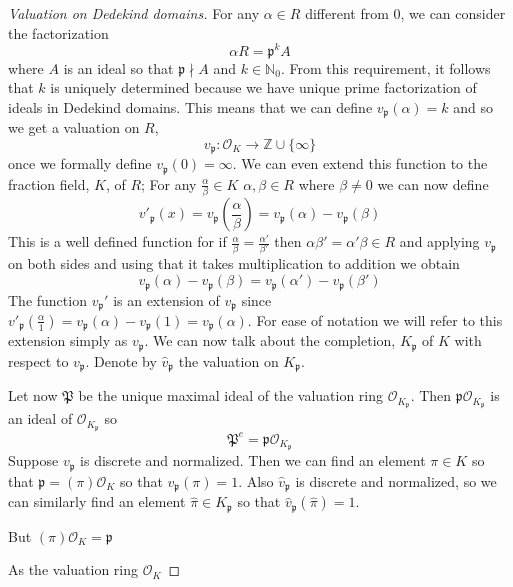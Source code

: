 \documentclass{article}
\newcommand{\mfrak}[1]{\mathfrak{#1}}
\newcommand{\mcal}[1]{\mathcal{#1}}
\newcommand{\mbb}[1]{\mathbb{#1}}
\begin{document}
\begin{proof}[Valuation on Dedekind domains]
    For any $\alpha \in R$ different from 0, we can consider the factorization
    $$\alpha R = \mfrak p^k A$$
    where $A$ is an ideal so that $\mfrak{p} \nmid A$ and $k \in \mbb N_0$. From this requirement, it follows that $k$ is uniquely determined because we have unique prime factorization of ideals in Dedekind domains. This means that we can define $v_\mfrak p(\alpha) = k$ and so we get a valuation on $R$,
    $$v_\mfrak p : \mathcal O_K \to \mbb{Z} \cup \{\infty\}$$
    once we formally define $v_\mfrak p(0) = \infty$. We can even extend this function to the fraction field, $K$, of $R$; For any $\frac{\alpha}{\beta} \in K$ $\alpha, \beta \in R$ where $\beta \neq 0$ we can now define
    $$v'_\mfrak p(x) = v_\mfrak p \left(\frac{\alpha}{\beta}\right) = v_\mfrak p(\alpha) - v_\mfrak p(\beta)$$
    This is a well defined function for if $\frac{\alpha}{\beta} = \frac{\alpha'}{\beta'}$ then $\alpha\beta' = \alpha'\beta \in R$ and applying $v_\mfrak{p}$ on both sides and using that it takes multiplication to addition we obtain
    $$v_\mfrak{p}(\alpha) - v_\mfrak{p}(\beta) = v_\mfrak{p}(\alpha') - v_\mfrak{p}(\beta')$$
    The function $v_\mfrak p'$ is an extension of $v_\mfrak p$ since $v'_\mfrak p(\frac{\alpha}{1}) = v_\mfrak p(\alpha) - v_\mfrak p (1) = v_\mfrak p(\alpha)$. For ease of notation we will refer to this extension simply as $v_\mfrak p$. We can now talk about the completion, $K_\mfrak p$ of $K$ with respect to $v_\mfrak p$. Denote by $\hat v_\mfrak p$ the valuation on $K_\mfrak p$. 
    
    
    
    Let now $\mfrak P$ be the unique maximal ideal of the valuation ring $\mcal O_{K_\mfrak p}$. Then $\mfrak p \mcal O_{K_\mfrak p}$ is an ideal of $\mcal O_{K_\mfrak p}$ so 
    $$\mfrak P^e = \mfrak p \mcal O_{K_\mfrak p}$$
    Suppose $v_\mfrak p$ is discrete and normalized. Then we can find an element $\pi \in K$ so that $\mfrak p = (\pi) \mcal O_K$ so that $v_\mfrak p(\pi) = 1$. Also $\hat v_\mfrak p$ is discrete and normalized, so we can similarly find an element $\hat \pi \in K_\mfrak p$ so that $\hat v_\mfrak p(\hat \pi) = 1$. 
    
    But $(\pi) \mcal O_K = \mfrak p$
    
    As the valuation ring $\mcal O_K$  

\end{proof}
\end{document}

